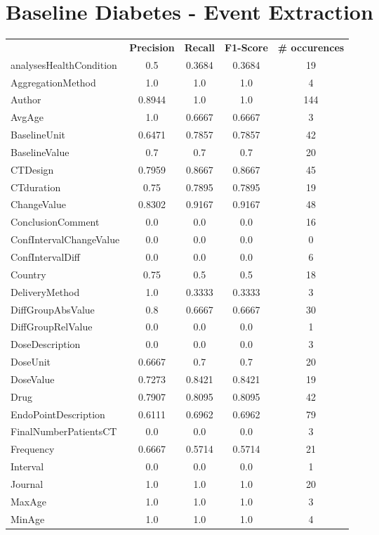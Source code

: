 \section{Baseline Diabetes - Event Extraction}
\begin{longtable}{ l c c c c}
 & \textbf{Precision} & \textbf{Recall} & \textbf{F1-Score} & \textbf{\# occurences} \\ \cline{1-5}
analysesHealthCondition & 0.5 & 0.3684 & 0.3684 & 19\\
AggregationMethod & 1.0 & 1.0 & 1.0 & 4\\
Author & 0.8944 & 1.0 & 1.0 & 144\\
AvgAge & 1.0 & 0.6667 & 0.6667 & 3\\
BaselineUnit & 0.6471 & 0.7857 & 0.7857 & 42\\
BaselineValue & 0.7 & 0.7 & 0.7 & 20\\
CTDesign & 0.7959 & 0.8667 & 0.8667 & 45\\
CTduration & 0.75 & 0.7895 & 0.7895 & 19\\
ChangeValue & 0.8302 & 0.9167 & 0.9167 & 48\\
ConclusionComment & 0.0 & 0.0 & 0.0 & 16\\
ConfIntervalChangeValue & 0.0 & 0.0 & 0.0 & 0\\
ConfIntervalDiff & 0.0 & 0.0 & 0.0 & 6\\
Country & 0.75 & 0.5 & 0.5 & 18\\
DeliveryMethod & 1.0 & 0.3333 & 0.3333 & 3\\
DiffGroupAbsValue & 0.8 & 0.6667 & 0.6667 & 30\\
DiffGroupRelValue & 0.0 & 0.0 & 0.0 & 1\\
DoseDescription & 0.0 & 0.0 & 0.0 & 3\\
DoseUnit & 0.6667 & 0.7 & 0.7 & 20\\
DoseValue & 0.7273 & 0.8421 & 0.8421 & 19\\
Drug & 0.7907 & 0.8095 & 0.8095 & 42\\
EndoPointDescription & 0.6111 & 0.6962 & 0.6962 & 79\\
FinalNumberPatientsCT & 0.0 & 0.0 & 0.0 & 3\\
Frequency & 0.6667 & 0.5714 & 0.5714 & 21\\
Interval & 0.0 & 0.0 & 0.0 & 1\\
Journal & 1.0 & 1.0 & 1.0 & 20\\
MaxAge & 1.0 & 1.0 & 1.0 & 3\\
MinAge & 1.0 & 1.0 & 1.0 & 4\\

\end{longtable}
